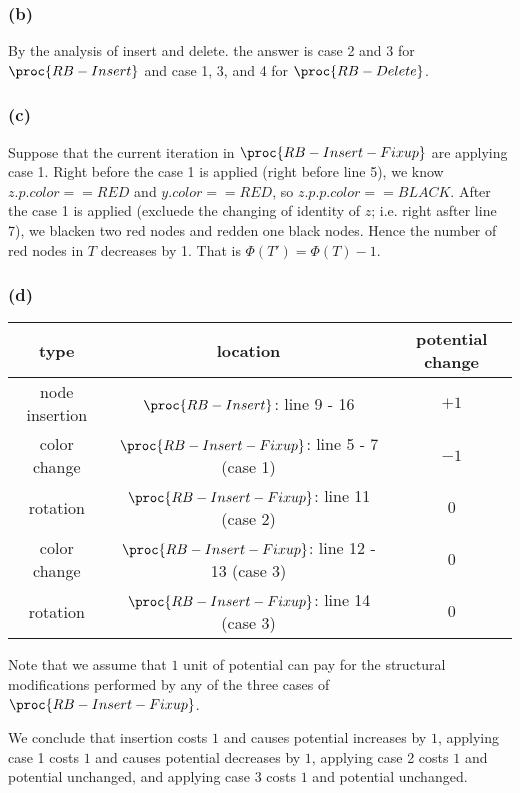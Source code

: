 \subsubsection*{(b)}

By the analysis of insert and delete.
the answer is case 2 and 3 for $\proc{RB-Insert}$
and case 1, 3, and 4 for $\proc{RB-Delete}$.

\subsubsection*{(c)}

Suppose that the current iteration in $\proc{RB-Insert-Fixup}$ are applying case 1.
Right before the case 1 is applied
(right before line 5),
we know $z.p.color == RED$ and $y.color == RED$,
so $z.p.p.color == BLACK$.
After the case 1 is applied 
(excluede the changing of identity of $z$;
i.e. right asfter line 7),
we blacken two red nodes and redden one black nodes.
Hence the number of red nodes in $T$ decreases by 1.
That is $\Phi(T') = \Phi(T) - 1$.

\subsubsection*{(d)}

\begin{tabular}{c|c|c}
    type & location & potential change \\ 
    \hline
    node insertion & $\proc{RB-Insert}$: line 9 - 16 & $+1$ \\
    color change & $\proc{RB-Insert-Fixup}$: line 5 - 7 (case 1) & $-1$ \\
    rotation & $\proc{RB-Insert-Fixup}$: line 11 (case 2) & $0$ \\
    color change & $\proc{RB-Insert-Fixup}$: line 12 - 13 (case 3) & $0$ \\
    rotation & $\proc{RB-Insert-Fixup}$: line 14 (case 3) & $0$ \\
\end{tabular}

Note that we assume that $1$ unit of potential can pay for
the structural modifications performed 
by any of the three cases of $\proc{RB-Insert-Fixup}$.

We conclude that insertion costs $1$ and causes potential increases by $1$,
applying case 1 costs $1$ and causes potential decreases by $1$,
applying case 2 costs $1$ and potential unchanged,
and applying case 3 costs $1$ and potential unchanged.

